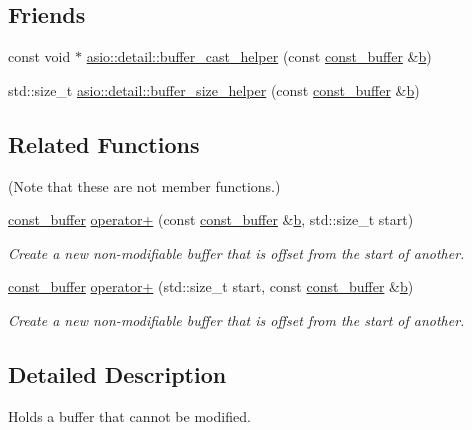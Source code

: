 \subsection*{Friends}
\begin{DoxyCompactItemize}
\item 
const void $\ast$ \hyperlink{classasio_1_1const__buffer_a43c694ae25ddbfe3f2c18921dbe90022}{asio\+::detail\+::buffer\+\_\+cast\+\_\+helper} (const \hyperlink{classasio_1_1const__buffer}{const\+\_\+buffer} \&\hyperlink{group__async__read_ga945a5c18fa77a9e2eba420f8f44b2a4f}{b})
\item 
std\+::size\+\_\+t \hyperlink{classasio_1_1const__buffer_a4835ee764d7a5c3658240f914fe272fa}{asio\+::detail\+::buffer\+\_\+size\+\_\+helper} (const \hyperlink{classasio_1_1const__buffer}{const\+\_\+buffer} \&\hyperlink{group__async__read_ga945a5c18fa77a9e2eba420f8f44b2a4f}{b})
\end{DoxyCompactItemize}
\subsection*{Related Functions}
(Note that these are not member functions.) \begin{DoxyCompactItemize}
\item 
\hyperlink{classasio_1_1const__buffer}{const\+\_\+buffer} \hyperlink{classasio_1_1const__buffer_aa4af787162d3dd81d5b169cc83164e0e}{operator+} (const \hyperlink{classasio_1_1const__buffer}{const\+\_\+buffer} \&\hyperlink{group__async__read_ga945a5c18fa77a9e2eba420f8f44b2a4f}{b}, std\+::size\+\_\+t start)
\begin{DoxyCompactList}\small\item\em Create a new non-\/modifiable buffer that is offset from the start of another. \end{DoxyCompactList}\item 
\hyperlink{classasio_1_1const__buffer}{const\+\_\+buffer} \hyperlink{classasio_1_1const__buffer_a224c008f5a0f8a792327d9770f3d1e8e}{operator+} (std\+::size\+\_\+t start, const \hyperlink{classasio_1_1const__buffer}{const\+\_\+buffer} \&\hyperlink{group__async__read_ga945a5c18fa77a9e2eba420f8f44b2a4f}{b})
\begin{DoxyCompactList}\small\item\em Create a new non-\/modifiable buffer that is offset from the start of another. \end{DoxyCompactList}\end{DoxyCompactItemize}


\subsection{Detailed Description}
Holds a buffer that cannot be modified. 

